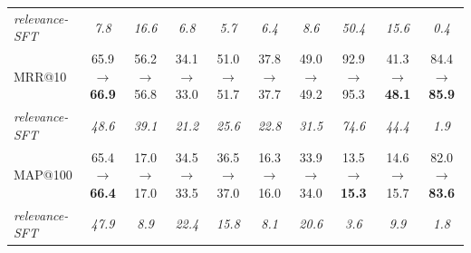 \begin{table}[H]
{\begin{tabular}{lccccccccc}
\quad \textit{relevance-SFT} & \textit{7.8} & \textit{16.6} & \textit{6.8} & \textit{5.7} & \textit{6.4} & \textit{8.6} & \textit{50.4} & \textit{15.6} & \textit{0.4} \\
MRR@10 & 65.9 $\rightarrow$ \textbf{66.9} & 56.2 $\rightarrow$ 56.8 & 34.1 $\rightarrow$ 33.0 & 51.0 $\rightarrow$ 51.7 & 37.8 $\rightarrow$ 37.7 & 49.0 $\rightarrow$ 49.2 & 92.9 $\rightarrow$ 95.3 & 41.3 $\rightarrow$ \textbf{48.1} & 84.4 $\rightarrow$ \textbf{85.9} \\
\quad \textit{relevance-SFT} & \textit{48.6} & \textit{39.1} & \textit{21.2} & \textit{25.6} & \textit{22.8} & \textit{31.5} & \textit{74.6} & \textit{44.4} & \textit{1.9} \\
MAP@100 & 65.4 $\rightarrow$ \textbf{66.4} & 17.0 $\rightarrow$ 17.0 & 34.5 $\rightarrow$ 33.5 & 36.5 $\rightarrow$ 37.0 & 16.3 $\rightarrow$ 16.0 & 33.9 $\rightarrow$ 34.0 & 13.5 $\rightarrow$ \textbf{15.3} & 14.6 $\rightarrow$ 15.7 & 82.0 $\rightarrow$ \textbf{83.6} \\
\quad \textit{relevance-SFT} & \textit{47.9} & \textit{8.9} & \textit{22.4} & \textit{15.8} & \textit{8.1} & \textit{20.6} & \textit{3.6} & \textit{9.9} & \textit{1.8} \\
\bottomrule
\end{tabular}}
\end{table}
